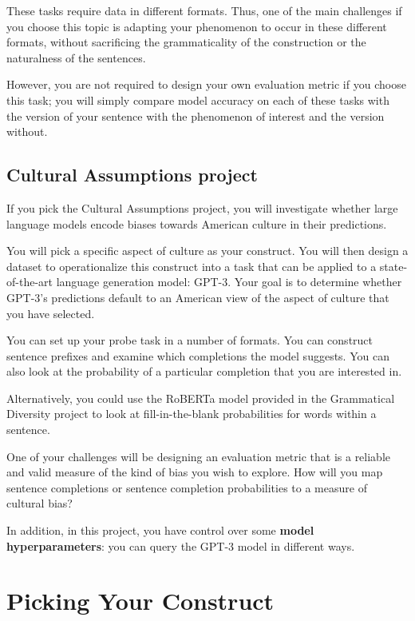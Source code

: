 \documentclass[12pt,table]{article}
\begin{document}
These tasks require data in different formats. Thus, one of the main challenges if you choose this topic is adapting your phenomenon to occur in these different formats, without sacrificing the grammaticality of the construction or the naturalness of the sentences. 

However, you are not required to design your own evaluation metric if you choose this task; you will simply compare model accuracy on each of these tasks with the version of your sentence with the phenomenon of interest and the version without.

\subsection{Cultural Assumptions project}

If you pick the Cultural Assumptions project, you will investigate whether large language models encode biases towards American culture in their predictions. 

You will pick a specific aspect of culture as your construct. You will then design a dataset to operationalize this construct into a task that can be applied to a state-of-the-art language generation model: GPT-3. Your goal is to determine whether GPT-3's predictions default to an American view of the aspect of culture that you have selected.

You can set up your probe task in a number of formats. You can construct sentence prefixes and examine which completions the model suggests. You can also look at the probability of a particular completion that you are interested in. 

Alternatively, you could use the RoBERTa model provided in the Grammatical Diversity project to  look at fill-in-the-blank probabilities for words within a sentence.

One of your challenges will be designing an evaluation metric that is a reliable and valid measure of the kind of bias you wish to explore. How will you map sentence completions or sentence completion probabilities to a measure of cultural bias?

In addition, in this project, you have control over some \textbf{model hyperparameters}: you can query the GPT-3 model in different ways.

\section{Picking Your Construct}
\end{document}
